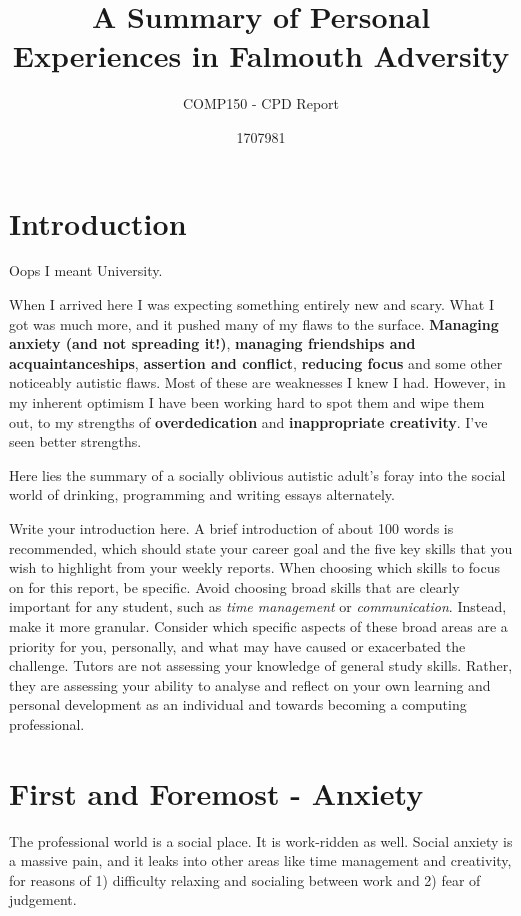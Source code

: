 \documentclass{scrartcl}
\title{A Summary of Personal Experiences in Falmouth Adversity}
\subtitle{COMP150 - CPD Report}
\author{1707981}
\begin{document}
\maketitle

\section{Introduction}
Oops I meant University.

When I arrived here I was expecting something entirely new and scary. What I got was much more, and it pushed many of my flaws to the surface. \textbf{Managing anxiety (and not spreading it!)}, \textbf{managing friendships and acquaintanceships}, \textbf{assertion and conflict}, \textbf{reducing focus} and some other noticeably autistic flaws. Most of these are weaknesses I knew I had. However, in my inherent optimism I have been working hard to spot them and wipe them out, to my strengths of \textbf{overdedication} and \textbf{inappropriate creativity}. I've seen better strengths.

Here lies the summary of a socially oblivious autistic adult's foray into the social world of drinking, programming and writing essays alternately.

Write your introduction here. A brief introduction of about 100 words is recommended, which should state your career goal and the five key skills that you wish to highlight from your weekly reports. When choosing which skills to focus on for this report, be specific. Avoid choosing broad skills that are clearly important for any student, such as \textit{time management} or \textit{communication}. Instead, make it more granular. Consider which specific aspects of these broad areas are a priority for you, personally, and what may have caused or exacerbated the challenge. Tutors are not assessing your knowledge of general study skills. Rather, they are assessing your ability to analyse and reflect on your own learning and personal development as an individual and towards becoming a computing professional.

\section{First and Foremost - Anxiety}
The professional world is a social place. It is work-ridden as well. Social anxiety is a massive pain, and it leaks into other areas like time management and creativity, for reasons of 1) difficulty relaxing and socialing between work and 2) fear of judgement.
\end{document}

